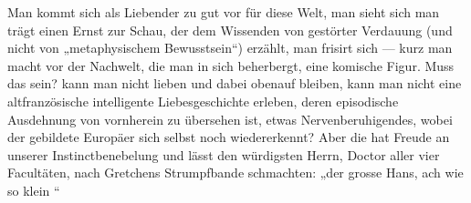 Man kommt sich als Liebender zu gut vor für diese Welt, man sieht sich  man trägt einen Ernst zur Schau, der dem Wissenden von gestörter Verdauung (und nicht von „metaphysischem Bewusstsein“) erzählt, man frisirt sich  — kurz man macht vor der Nachwelt, die man in sich beherbergt, eine komische Figur. Muss das sein? kann man nicht lieben und dabei obenauf bleiben, kann man nicht eine altfranzösische intelligente Liebesgeschichte erleben, deren episodische Ausdehnung von vornherein zu übersehen ist, etwas Nervenberuhigendes, wobei der gebildete Europäer sich selbst noch wiedererkennt? Aber die  hat Freude an unserer Instinctbenebelung und lässt den würdigsten Herrn, Doctor aller vier Facultäten, nach Gretchens Strumpfbande schmachten: „der grosse Hans, ach wie so klein “
\par

